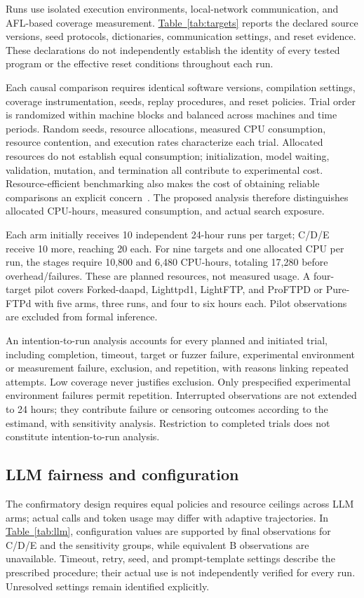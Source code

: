 \documentclass[final,5p,times,number]{elsarticle}
\newcommand{\namedref}[2]{\hyperref[#2]{#1~\ref*{#2}}}
\begin{document}
Runs use isolated execution environments, local-network communication, and AFL-based coverage measurement. \namedref{Table}{tab:targets} reports the declared source versions, seed protocols, dictionaries, communication settings, and reset evidence. These declarations do not independently establish the identity of every tested program or the effective reset conditions throughout each run.

Each causal comparison requires identical software versions, compilation settings, coverage instrumentation, seeds, replay procedures, and reset policies. Trial order is randomized within machine blocks and balanced across machines and time periods. Random seeds, resource allocations, measured CPU consumption, resource contention, and execution rates characterize each trial. Allocated resources do not establish equal consumption; initialization, model waiting, validation, mutation, and termination all contribute to experimental cost. Resource-efficient benchmarking also makes the cost of obtaining reliable comparisons an explicit concern~\cite{greenbenchmark2023}. The proposed analysis therefore distinguishes allocated CPU-hours, measured consumption, and actual search exposure.

Each arm initially receives 10 independent 24-hour runs per target; C/D/E receive 10 more, reaching 20 each. For nine targets and one allocated CPU per run, the stages require 10,800 and 6,480 CPU-hours, totaling 17,280 before overhead/failures. These are planned resources, not measured usage. A four-target pilot covers Forked-daapd, Lighttpd1, LightFTP, and ProFTPD or Pure-FTPd with five arms, three runs, and four to six hours each. Pilot observations are excluded from formal inference.

An intention-to-run analysis accounts for every planned and initiated trial, including completion, timeout, target or fuzzer failure, experimental environment or measurement failure, exclusion, and repetition, with reasons linking repeated attempts. Low coverage never justifies exclusion. Only prespecified experimental environment failures permit repetition. Interrupted observations are not extended to 24 hours; they contribute failure or censoring outcomes according to the estimand, with sensitivity analysis. Restriction to completed trials does not constitute intention-to-run analysis.

\subsection{LLM fairness and configuration}
The confirmatory design requires equal policies and resource ceilings across LLM arms; actual calls and token usage may differ with adaptive trajectories. In \namedref{Table}{tab:llm}, configuration values are supported by final observations for C/D/E and the sensitivity groups, while equivalent B observations are unavailable. Timeout, retry, seed, and prompt-template settings describe the prescribed procedure; their actual use is not independently verified for every run. Unresolved settings remain identified explicitly.
\end{document}
